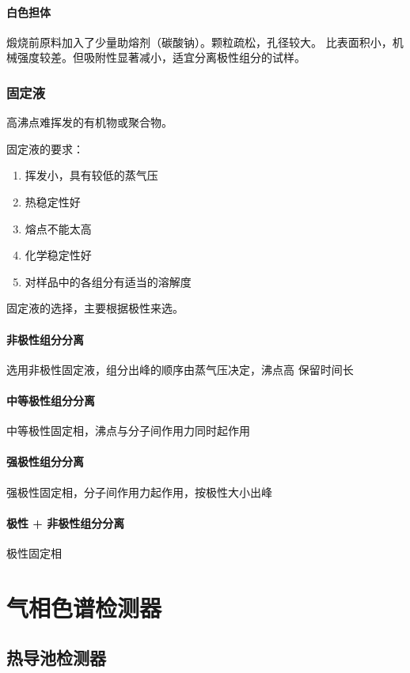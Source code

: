 \paragraph{白色担体} 煅烧前原料加入了少量助熔剂（碳酸钠）。颗粒疏松，孔径较大。
比表面积小，机械强度较差。但吸附性显著减小，适宜分离极性组分的试样。


\subsubsection{固定液}

高沸点难挥发的有机物或聚合物。

固定液的要求：

\begin{enumerate}
    \item 挥发小，具有较低的蒸气压
    \item 热稳定性好
    \item 熔点不能太高
    \item 化学稳定性好
    \item 对样品中的各组分有适当的溶解度
\end{enumerate}

固定液的选择，主要根据极性来选。

\paragraph{非极性组分分离} 选用非极性固定液，组分出峰的顺序由蒸气压决定，沸点高
保留时间长

\paragraph{中等极性组分分离} 中等极性固定相，沸点与分子间作用力同时起作用

\paragraph{强极性组分分离} 强极性固定相，分子间作用力起作用，按极性大小出峰

\paragraph{极性 + 非极性组分分离} 极性固定相

\section{气相色谱检测器}

\subsection{热导池检测器}

